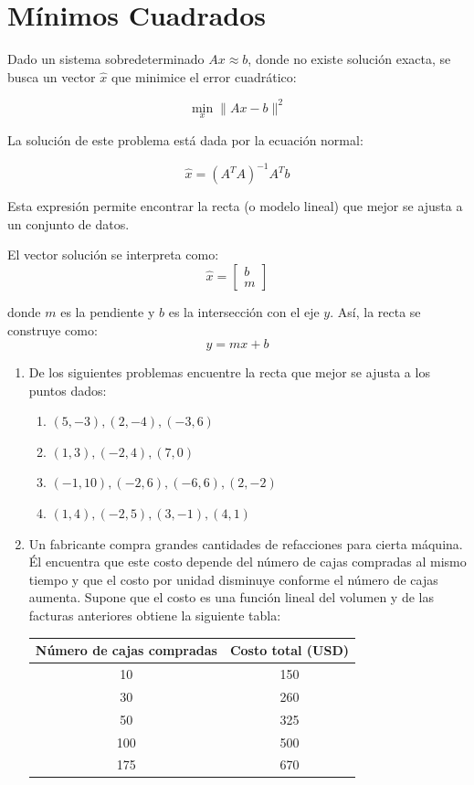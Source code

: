\documentclass[12pt,letterpaper]{article}
\begin{document}
\section*{Mínimos Cuadrados}

\vspace{0.3cm}

Dado un sistema sobredeterminado $Ax \approx b$, donde no existe solución exacta,
se busca un vector $\hat{x}$ que minimice el error cuadrático:

\[
\min_x \|Ax - b\|^2
\]

La solución de este problema está dada por la ecuación normal:

\[
\hat{x} = (A^T A)^{-1} A^T b
\]

Esta expresión permite encontrar la recta (o modelo lineal) que mejor se ajusta a un conjunto de datos.

El vector solución se interpreta como:
\[
\hat{x} =
\begin{bmatrix}
b \\
m
\end{bmatrix}
\]

donde $m$ es la pendiente y $b$ es la intersección con el eje $y$.  
Así, la recta se construye como:
\[
y = mx + b
\]

\vspace{0.5cm}

\begin{enumerate}
    \item De los siguientes problemas encuentre la recta que mejor se ajusta a los puntos dados:
    \begin{enumerate}
        \item $(5,-3),(2,-4),(-3,6)$
        \item $(1,3),(-2,4),(7,0)$
        \item $(-1, 10), (-2, 6), (-6, 6), (2, -2)$
        \item $(1, 4), (-2, 5), (3, -1), (4, 1)$
    \end{enumerate}
    
    \item Un fabricante compra grandes cantidades de refacciones para cierta máquina. Él encuentra
que este costo depende del número de cajas compradas al mismo tiempo y que el costo
por unidad disminuye conforme el número de cajas aumenta. Supone que el costo es una
función lineal del volumen y de las facturas anteriores obtiene la siguiente tabla:
\begin{table}[h!]
\centering
\begin{tabular}{ |cc| } 
\hline
Número de cajas compradas & Costo total (USD)  \\
\hline
10 & 150 \\
30 & 260 \\
50 & 325 \\
100 & 500 \\
175 & 670 \\
\hline
\end{tabular}
\end{table}
\end{enumerate}
\end{document}
